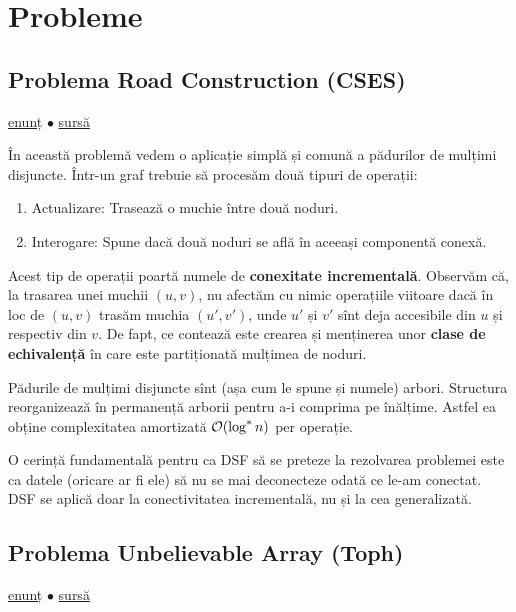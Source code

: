 \documentclass[../main.tex]{subfiles}
\begin{document}
\section{Probleme}

\subsection{Problema Road Construction (CSES)}
\label{problem:road-construction}

\href{https://cses.fi/problemset/task/1676}{enunț}
$\bullet$
\hyperref[code:road-construction]{sursă}

În această problemă vedem o aplicație simplă și comună a pădurilor de mulțimi disjuncte. Într-un graf trebuie să procesăm două tipuri de operații:

\begin{enumerate}
  \item Actualizare: Trasează o muchie între două noduri.
  \item Interogare: Spune dacă două noduri se află în aceeași componentă conexă.
\end{enumerate}

Acest tip de operații poartă numele de \textbf{conexitate incrementală}. Observăm că, la trasarea unei muchii $(u, v)$, nu afectăm cu nimic operațiile viitoare dacă în loc de $(u, v)$ trasăm muchia $(u', v')$, unde $u'$ și $v'$ sînt deja accesibile din $u$ și respectiv din $v$. De fapt, ce contează este crearea și menținerea unor \textbf{clase de echivalență} în care este partiționată mulțimea de noduri.

Pădurile de mulțimi disjuncte sînt (așa cum le spune și numele) arbori. Structura reorganizează în permanență arborii pentru a-i comprima pe înălțime. Astfel ea obține complexitatea amortizată $\mathcal{O}(\log^{*} n)$ per operație.

O cerință fundamentală pentru ca DSF să se preteze la rezolvarea problemei este ca datele (oricare ar fi ele) să nu se mai deconecteze odată ce le-am conectat. DSF se aplică doar la conectivitatea incrementală, nu și la cea generalizată.


\subsection{Problema Unbelievable Array (Toph)}
\label{problem:unbelievable-array}

\href{https://toph.co/p/unbelievable-array}{enunț}
$\bullet$
\hyperref[code:unbelievable-array]{sursă}
\end{document}

